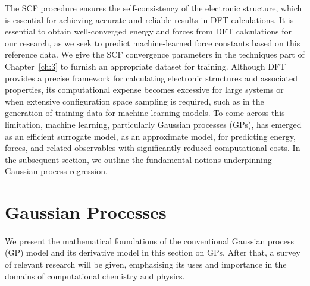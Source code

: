 The SCF procedure ensures the self-consistency of the electronic structure, which is essential for achieving accurate and reliable results in DFT calculations. It is essential to obtain well-converged energy and forces from DFT calculations for our research, as we seek to predict machine-learned force constants based on this reference data.  We give the SCF convergence parameters in the techniques part of Chapter~\ref{ch:3} to furnish an appropriate dataset for training.
\cite{Sun2015}
Although DFT provides a precise framework for calculating electronic structures and associated properties, its computational expense becomes excessive for large systems or when extensive configuration space sampling is required, such as in the generation of training data for machine learning models.  To come across this limitation, machine learning, particularly Gaussian processes (GPs), has emerged as an efficient surrogate model, as an approximate model, for predicting energy, forces, and related observables with significantly reduced computational costs.  In the subsequent section, we outline the fundamental notions underpinning Gaussian process regression.

\newpage
\section{Gaussian Processes} \label{sec:2.3}
\paragraph{}
We present the mathematical foundations of the conventional Gaussian process (GP) model and its derivative model in this section on GPs.
After that, a survey of relevant research will be given, emphasising its uses and importance in the domains of computational chemistry and physics.

